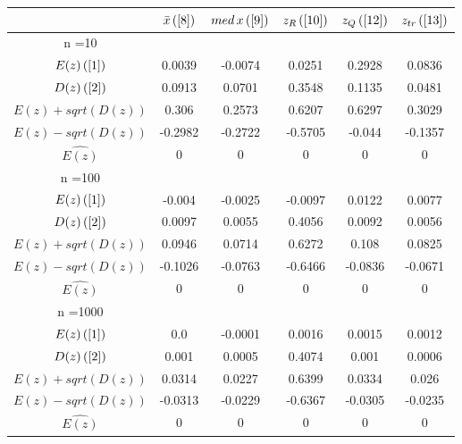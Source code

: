 \begin{tabular}{|c|c|c|c|c|c|}
\hline
 & $\bar{x} \, (\ref{8})$ & $med \, x \, (\ref{9})$ & $z_R \, (\ref{10})$ & $z_Q \, (\ref{12})$ & $z_{tr} \, (\ref{13})$ \\
\hline
n =10 &  &  &  &  & \\
\hline
$E(z) \, (\ref{1})$ & 0.0039 & -0.0074 & 0.0251 & 0.2928 & 0.0836\\
\hline
$D(z) \, (\ref{2})$ & 0.0913 & 0.0701 & 0.3548 & 0.1135 & 0.0481\\
\hline
$E(z)+sqrt(D(z))$ & 0.306 & 0.2573 & 0.6207 & 0.6297 & 0.3029\\
\hline
$E(z)-sqrt(D(z))$ & -0.2982 & -0.2722 & -0.5705 & -0.044 & -0.1357\\
\hline
$\hat{E(z)}$ & 0 & 0 & 0 & 0 & 0\\
\hline
n =100 &  &  &  &  & \\
\hline
$E(z) \, (\ref{1})$ & -0.004 & -0.0025 & -0.0097 & 0.0122 & 0.0077\\
\hline
$D(z) \, (\ref{2})$ & 0.0097 & 0.0055 & 0.4056 & 0.0092 & 0.0056\\
\hline
$E(z)+sqrt(D(z))$ & 0.0946 & 0.0714 & 0.6272 & 0.108 & 0.0825\\
\hline
$E(z)-sqrt(D(z))$ & -0.1026 & -0.0763 & -0.6466 & -0.0836 & -0.0671\\
\hline
$\hat{E(z)}$ & 0 & 0 & 0 & 0 & 0\\
\hline
n =1000 &  &  &  &  & \\
\hline
$E(z) \, (\ref{1})$ & 0.0 & -0.0001 & 0.0016 & 0.0015 & 0.0012\\
\hline
$D(z) \, (\ref{2})$ & 0.001 & 0.0005 & 0.4074 & 0.001 & 0.0006\\
\hline
$E(z)+sqrt(D(z))$ & 0.0314 & 0.0227 & 0.6399 & 0.0334 & 0.026\\
\hline
$E(z)-sqrt(D(z))$ & -0.0313 & -0.0229 & -0.6367 & -0.0305 & -0.0235\\
\hline
$\hat{E(z)}$ & 0 & 0 & 0 & 0 & 0\\
\hline
\end{tabular}